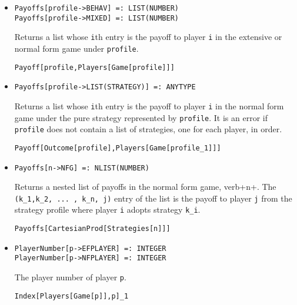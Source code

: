 \begin{itemize}
\item{}
\protect \large \begin{verbatim}
Payoffs[profile->BEHAV] =: LIST(NUMBER) 
Payoffs[profile->MIXED] =: LIST(NUMBER) 
\end{verbatim}\normalsize

\bd 
Returns a list whose \verb+i+th entry is the payoff to player \verb+i+
in the extensive or normal form game under \verb+profile+.
\begin{verbatim}
Payoff[profile,Players[Game[profile]]]
\end{verbatim} 
\ed

\item{}
\protect \large \begin{verbatim}
Payoffs[profile->LIST(STRATEGY)] =: ANYTYPE 
\end{verbatim}\normalsize

\bd 
Returns a list whose \verb+i+th entry is the payoff to player \verb+i+
in the normal form game under the pure strategy represented by \verb+profile+.
It is an error if \verb+profile+ does not contain a list of
strategies, one for each player, in order.  
\begin{verbatim}
Payoff[Outcome[profile],Players[Game[profile_1]]]
\end{verbatim} 
\ed


\item{}
\protect \large \begin{verbatim}
Payoffs[n->NFG] =: NLIST(NUMBER) 
\end{verbatim}\normalsize

\bd 
Returns a nested list of payoffs in the normal form game, verb+n+.
The \verb+(k_1,k_2, ... , k_n, j)+ entry of the list is the payoff to
player \verb+j+ from the strategy profile where player \verb+i+ adopts
strategy \verb+k_i+.
\begin{verbatim}
Payoffs[CartesianProd[Strategies[n]]]
\end{verbatim} 
\ed
  

\item{}
\protect \large \begin{verbatim}
PlayerNumber[p->EFPLAYER] =: INTEGER 
PlayerNumber[p->NFPLAYER] =: INTEGER 
\end{verbatim}\normalsize

\bd 
The player number of player \verb+p+.
\begin{verbatim}
Index[Players[Game[p]],p]_1
\end{verbatim} 
\ed


\end{itemize}
